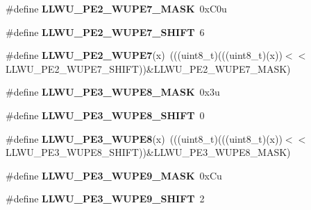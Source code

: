 \begin{DoxyCompactItemize}
\item 
\#define {\bfseries L\+L\+W\+U\+\_\+\+P\+E2\+\_\+\+W\+U\+P\+E7\+\_\+\+M\+A\+SK}~0x\+C0u\hypertarget{group__LLWU__Register__Masks_ga39b30f51fdd7f83bb5aa29bf2bc87c26}{}\label{group__LLWU__Register__Masks_ga39b30f51fdd7f83bb5aa29bf2bc87c26}

\item 
\#define {\bfseries L\+L\+W\+U\+\_\+\+P\+E2\+\_\+\+W\+U\+P\+E7\+\_\+\+S\+H\+I\+FT}~6\hypertarget{group__LLWU__Register__Masks_ga82bfb99732d7f90dacdc01ef5222a59a}{}\label{group__LLWU__Register__Masks_ga82bfb99732d7f90dacdc01ef5222a59a}

\item 
\#define {\bfseries L\+L\+W\+U\+\_\+\+P\+E2\+\_\+\+W\+U\+P\+E7}(x)~(((uint8\+\_\+t)(((uint8\+\_\+t)(x))$<$$<$L\+L\+W\+U\+\_\+\+P\+E2\+\_\+\+W\+U\+P\+E7\+\_\+\+S\+H\+I\+FT))\&L\+L\+W\+U\+\_\+\+P\+E2\+\_\+\+W\+U\+P\+E7\+\_\+\+M\+A\+SK)\hypertarget{group__LLWU__Register__Masks_gaecb28f5285444e1576a192260d5c3048}{}\label{group__LLWU__Register__Masks_gaecb28f5285444e1576a192260d5c3048}

\item 
\#define {\bfseries L\+L\+W\+U\+\_\+\+P\+E3\+\_\+\+W\+U\+P\+E8\+\_\+\+M\+A\+SK}~0x3u\hypertarget{group__LLWU__Register__Masks_gabe7fce492e2c0201c4bb5af893f5a63d}{}\label{group__LLWU__Register__Masks_gabe7fce492e2c0201c4bb5af893f5a63d}

\item 
\#define {\bfseries L\+L\+W\+U\+\_\+\+P\+E3\+\_\+\+W\+U\+P\+E8\+\_\+\+S\+H\+I\+FT}~0\hypertarget{group__LLWU__Register__Masks_gaf02591badd7f37915120d0fd627cdf27}{}\label{group__LLWU__Register__Masks_gaf02591badd7f37915120d0fd627cdf27}

\item 
\#define {\bfseries L\+L\+W\+U\+\_\+\+P\+E3\+\_\+\+W\+U\+P\+E8}(x)~(((uint8\+\_\+t)(((uint8\+\_\+t)(x))$<$$<$L\+L\+W\+U\+\_\+\+P\+E3\+\_\+\+W\+U\+P\+E8\+\_\+\+S\+H\+I\+FT))\&L\+L\+W\+U\+\_\+\+P\+E3\+\_\+\+W\+U\+P\+E8\+\_\+\+M\+A\+SK)\hypertarget{group__LLWU__Register__Masks_gad6e40b93385848a0a6dc1177f884107a}{}\label{group__LLWU__Register__Masks_gad6e40b93385848a0a6dc1177f884107a}

\item 
\#define {\bfseries L\+L\+W\+U\+\_\+\+P\+E3\+\_\+\+W\+U\+P\+E9\+\_\+\+M\+A\+SK}~0x\+Cu\hypertarget{group__LLWU__Register__Masks_gad03733955d18194da002aeceedc2edf5}{}\label{group__LLWU__Register__Masks_gad03733955d18194da002aeceedc2edf5}

\item 
\#define {\bfseries L\+L\+W\+U\+\_\+\+P\+E3\+\_\+\+W\+U\+P\+E9\+\_\+\+S\+H\+I\+FT}~2\hypertarget{group__LLWU__Register__Masks_ga26cad28b7fe4fd2da53ece9d3744016c}{}\label{group__LLWU__Register__Masks_ga26cad28b7fe4fd2da53ece9d3744016c}


\end{DoxyCompactItemize}
